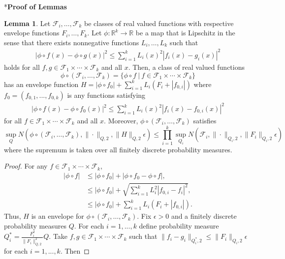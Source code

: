 \documentclass[12pt,oneside,reqno,english]{amsart}
\makeatletter
\renewcommand\subsection{\@startsection{subsection}{2}%
  \z@{-.5\linespacing\@plus-.7\linespacing}{.5\linespacing}%
  {\normalfont\scshape}}
\theoremstyle{definition}
\newtheorem{lemma}{Lemma}
\makeatother
\begin{document}
\subsection*{\bf{Proof of Lemmas}}
\begin{lemma}\label{l:entropy}
Let $\mathcal{F}_{i},\ldots,\mathcal{F}_{k}$ be classes of real valued functions with respective envelope functions $F_{i},\ldots,F_{k}$.  
Let $\phi:\mathbb{R}^{k}\rightarrow \mathbb{R}$ be a map that is Lipschitz in the sense that there exists nonnegative functions $L_{i},\ldots,L_{k}$
such that 
\begin{align*}
|\phi\circ f(x) -\phi\circ g(x)|^{2}\leq \sum_{i=1}^{k}L_{i}(x)^{2}|f_{i}(x)-g_{i}(x)|^{2}
\end{align*}
holds for all $f, g\in \mathcal{F}_{1}\times\cdots \times \mathcal{F}_{k}$ and all $x$. Then, a class of real valued functions
\[\phi\circ (\mathcal{F}_{i},\ldots,\mathcal{F}_{k}) = \{\phi\circ f \ | \ f\in  \mathcal{F}_{1}\times\cdots \times \mathcal{F}_{k}\}\]
has an envelope function $H=|\phi\circ f_{0}|+\sum_{i=1}^{k}L_{i}(F_{i}+|f_{0,i}|)$ where $f_{0}=(f_{0,1},...,f_{0,k})$ is any functions satisfying 
\begin{align*}
|\phi\circ f(x) -\phi\circ f_{0}(x)|^{2}\leq \sum_{i=1}^{k}L_{i}(x)^{2}|f_{i}(x)-f_{0,i}(x)|^{2}
\end{align*}
for all $f\in  \mathcal{F}_{1}\times\cdots \times \mathcal{F}_{k}$ and all $x$. Moreover, $\phi\circ (\mathcal{F}_{i},\ldots,\mathcal{F}_{k})$ satisfies 
\[\sup_{Q} N(\phi\circ (\mathcal{F}_{i},\ldots,\mathcal{F}_{k}),\|\cdot\|_{Q,2},\|H\|_{Q,2}\epsilon)\leq 
\prod_{i=1}^{k}\sup_{Q_{i}} N(\mathcal{F}_{i},\| \cdot \|_{Q_{i},2},\|F_{i}\|_{Q_{i},2}\epsilon)\]
where the supremum is taken over all finitely discrete probability measures. 
\begin{proof}
For any $f\in \mathcal{F}_{1}\times\cdots \times \mathcal{F}_{k}$, 
\begin{align*}
|\phi\circ f|&\leq |\phi\circ f_{0}| + |\phi\circ f_{0}-\phi\circ f |,\\
&\leq |\phi\circ f_{0}| + \sqrt{\sum_{i=1}^{k}L_{i}^{2}|f_{0,i}-f_{i}|^{2}},\\
&\leq |\phi\circ f_{0}| + \sum_{i=1}^{k}L_{i}(F_{i}+|f_{0,i}|).
\end{align*}
Thus, $H$ is an envelope for $\phi\circ (\mathcal{F}_{i},\ldots,\mathcal{F}_{k})$. Fix $\epsilon>0$ and a finitely discrete probability measures $Q$.
For each $i=1,...,k$ define probability measure $Q^{*}_{i}=\frac{F_{i}^{2}}{\|F_{i}\|_{Q,2}^{2}}Q$.
Take $f, g\in \mathcal{F}_{1}\times\cdots \times \mathcal{F}_{k}$ such that $\|f_{i}-g_{i}\|_{Q^{*}_{i},2}\leq \|F_{i}\|_{Q_{i},2}\epsilon$ for each $i=1,...,k$. Then 

\end{proof}
\end{lemma}
\end{document}
